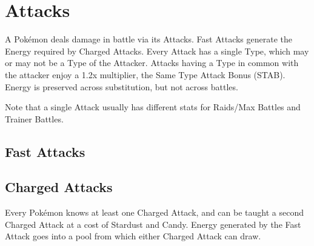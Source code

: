 \chapter{Attacks}
A Pokémon deals damage in battle via its Attacks. Fast Attacks generate the
Energy required by Charged Attacks. Every Attack has a single Type, which
may or may not be a Type of the Attacker. Attacks having a Type in common
with the attacker enjoy a 1.2x multiplier, the Same Type Attack Bonus (STAB).
Energy is preserved across substitution, but not across battles.

Note that a single Attack usually has different stats for
 Raids/Max Battles and Trainer Battles.

\section{Fast Attacks}

\section{Charged Attacks}
Every Pokémon knows at least one Charged Attack, and can be taught a second
Charged Attack at a cost of Stardust and Candy. Energy generated by the Fast
Attack goes into a pool from which either Charged Attack can draw.
